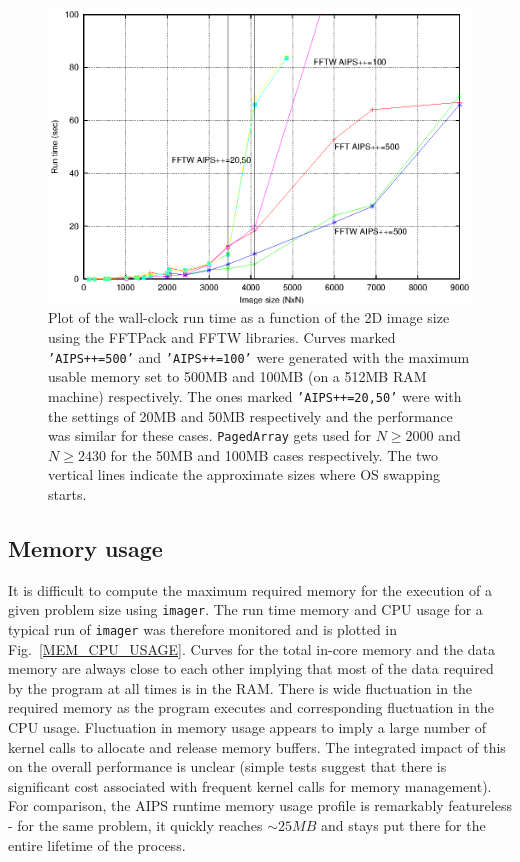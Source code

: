 \begin{figure}[h!]
\begin{center}
  \includegraphics[scale=0.9]{fft_time.eps}
\caption[FFTPack vs FFTW performance for 2D FFTs for larger sized
images]{\small Plot of the wall-clock run time as a function of the 2D image
size using the FFTPack and FFTW libraries.  Curves marked {\tt
'AIPS++=500'} and {\tt 'AIPS++=100'} were generated with the
maximum usable memory set to 500MB and 100MB (on a 512MB RAM machine)
respectively.  The ones marked {\tt 'AIPS++=20,50'} were with the
settings of 20MB and 50MB respectively and the performance was similar
for these cases. {\tt PagedArray} gets used for $N \ge 2000$ and $N
\ge 2430$ for the 50MB and 100MB cases respectively.  The two vertical lines
indicate the approximate sizes where OS swapping starts.}
\label{LARGE_FFT_PLOT}
\end{center}
\end{figure}

\subsection{Memory usage}
\label{A:MEM_MODEL}

It is difficult to compute the maximum required memory for the
execution of a given problem size using {\tt imager}.  The run time
memory and CPU usage for a typical run of {\tt imager} was therefore
monitored and is plotted in Fig.~\ref{MEM_CPU_USAGE}.  Curves for the
total in-core memory and the data memory are always close to each
other implying that most of the data required by the program at all
times is in the RAM.  There is wide fluctuation in the required memory
as the program executes and corresponding fluctuation in the CPU
usage.  Fluctuation in memory usage appears to imply a large number of
kernel calls to allocate and release memory buffers.  The integrated
impact of this on the overall performance is unclear (simple tests
suggest that there is significant cost associated with frequent kernel
calls for memory management).  For comparison, the AIPS runtime memory
usage profile is remarkably featureless - for the same problem, it
quickly reaches $\sim 25MB$ and stays put there for the entire
lifetime of the process.

